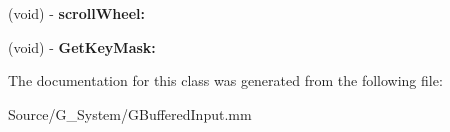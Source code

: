 \begin{DoxyCompactItemize}
\item 
(void) -\/ {\bfseries scroll\+Wheel\+:}\hypertarget{interfaceGResponder_af419f86d1634b577f9749a3ad0bf2040}{}\label{interfaceGResponder_af419f86d1634b577f9749a3ad0bf2040}

\item 
(void) -\/ {\bfseries Get\+Key\+Mask\+:}\hypertarget{interfaceGResponder_ae59e6d264d257ca2c6068f6dd861ae8c}{}\label{interfaceGResponder_ae59e6d264d257ca2c6068f6dd861ae8c}

\end{DoxyCompactItemize}


The documentation for this class was generated from the following file\+:\begin{DoxyCompactItemize}
\item 
Source/\+G\+\_\+\+System/G\+Buffered\+Input.\+mm\end{DoxyCompactItemize}
